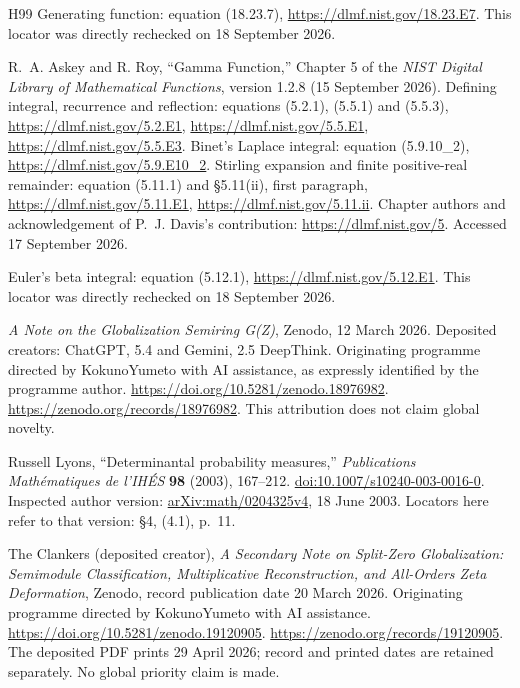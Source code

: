\begin{thebibliography}{H99}
Generating function: equation (18.23.7),
\url{https://dlmf.nist.gov/18.23.E7}.
This locator was directly rechecked on 18 September 2026.

R.~A. Askey and R. Roy,
``Gamma Function,'' Chapter 5 of the
\emph{NIST Digital Library of Mathematical Functions},
version 1.2.8 (15 September 2026).
Defining integral, recurrence and reflection:
equations (5.2.1), (5.5.1) and (5.5.3),
\url{https://dlmf.nist.gov/5.2.E1},
\url{https://dlmf.nist.gov/5.5.E1},
\url{https://dlmf.nist.gov/5.5.E3}.
Binet's Laplace integral: equation (5.9.10\_2),
\url{https://dlmf.nist.gov/5.9.E10_2}.
Stirling expansion and finite positive-real remainder:
equation (5.11.1) and \S5.11(ii), first paragraph,
\url{https://dlmf.nist.gov/5.11.E1},
\url{https://dlmf.nist.gov/5.11.ii}.
Chapter authors and acknowledgement of P.~J. Davis's contribution:
\url{https://dlmf.nist.gov/5}.
Accessed 17 September 2026.

Euler's beta integral: equation (5.12.1),
\url{https://dlmf.nist.gov/5.12.E1}.
This locator was directly rechecked on 18 September 2026.

\emph{A Note on the Globalization Semiring G(Z)}, Zenodo,
12 March 2026. Deposited creators: ChatGPT, 5.4 and Gemini, 2.5 DeepThink.
Originating programme directed by KokunoYumeto with AI assistance,
as expressly identified by the programme author.
\url{https://doi.org/10.5281/zenodo.18976982}.
\url{https://zenodo.org/records/18976982}.
This attribution does not claim global novelty.


Russell Lyons, ``Determinantal probability measures,''
\emph{Publications Math\'ematiques de l'IH\'ES} \textbf{98} (2003), 167--212.
\href{https://doi.org/10.1007/s10240-003-0016-0}{doi:10.1007/s10240-003-0016-0}.
Inspected author version: \href{https://arxiv.org/abs/math/0204325v4}{arXiv:math/0204325v4},
18 June 2003. Locators here refer to that version: \S4, (4.1), p.~11.


The Clankers (deposited creator), \emph{A Secondary Note on Split-Zero
Globalization: Semimodule Classification, Multiplicative Reconstruction,
and All-Orders Zeta Deformation}, Zenodo, record publication date
20 March 2026. Originating programme directed by KokunoYumeto
with AI assistance. \url{https://doi.org/10.5281/zenodo.19120905}.
\url{https://zenodo.org/records/19120905}.
The deposited PDF prints 29 April 2026; record and printed dates
are retained separately. No global priority claim is made.



\end{thebibliography}
